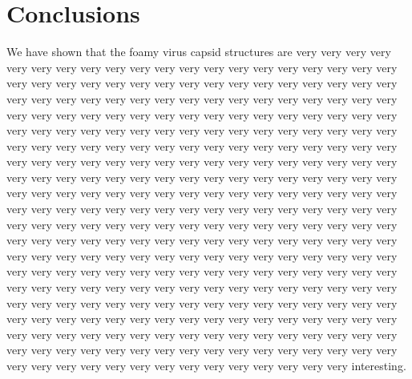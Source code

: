 \section{Conclusions}

We have shown that the foamy virus capsid structures are
very very very very very very very very very very very very very very very very very very very very very very very
very very very very very very very very very very very very very very very very very very very very very very very
very very very very very very very very very very very very very very very very very very very very very very very
very very very very very very very very very very very very very very very very very very very very very very very
very very very very very very very very very very very very very very very very very very very very very very very
very very very very very very very very very very very very very very very very very very very very very very very
very very very very very very very very very very very very very very very very very very very very very very very
very very very very very very very very very very very very very very very very very very very very very very very
very very very very very very very very very very very very very very very very very very very very very very very
very very very very very very very very very very very very very very very very very very very very very very very
very very very very very very very very very very very very very very very very very very very very very very very
very very very very very very very very very very very very very very very very very very very very very very very
very very very very very very very very very very very very very very very very very very very very very very very
very very very very very very very very very very very very very very very very very very very very very very very
interesting.
